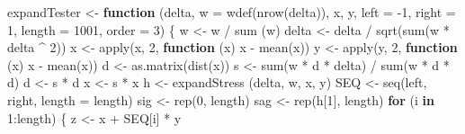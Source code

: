 \documentclass[
  12pt,
  letterpaper,
  DIV=11,
  numbers=noendperiod]{scrreprt}
\newenvironment{Shaded}{\begin{snugshade}}{\end{snugshade}}
\newcommand{\AttributeTok}[1]{\textcolor[rgb]{0.40,0.45,0.13}{#1}}
\newcommand{\ControlFlowTok}[1]{\textcolor[rgb]{0.00,0.23,0.31}{\textbf{#1}}}
\newcommand{\DecValTok}[1]{\textcolor[rgb]{0.68,0.00,0.00}{#1}}
\newcommand{\FunctionTok}[1]{\textcolor[rgb]{0.28,0.35,0.67}{#1}}
\newcommand{\NormalTok}[1]{\textcolor[rgb]{0.00,0.23,0.31}{#1}}
\newcommand{\OtherTok}[1]{\textcolor[rgb]{0.00,0.23,0.31}{#1}}
\newcommand{\SpecialCharTok}[1]{\textcolor[rgb]{0.37,0.37,0.37}{#1}}
\theoremstyle{remark}
\begin{document}
\begin{Shaded}
\begin{Highlighting}[]
\NormalTok{expandTester }\OtherTok{\textless{}{-}} \ControlFlowTok{function}\NormalTok{ (delta,}
                    \AttributeTok{w =} \FunctionTok{wdef}\NormalTok{(}\FunctionTok{nrow}\NormalTok{(delta)),}
\NormalTok{                    x,}
\NormalTok{                    y,}
                    \AttributeTok{left =} \SpecialCharTok{{-}}\DecValTok{1}\NormalTok{,}
                    \AttributeTok{right =} \DecValTok{1}\NormalTok{,}
                    \AttributeTok{length =} \DecValTok{1001}\NormalTok{,}
                    \AttributeTok{order =} \DecValTok{3}\NormalTok{) \{}
\NormalTok{  w }\OtherTok{\textless{}{-}}\NormalTok{ w }\SpecialCharTok{/} \FunctionTok{sum}\NormalTok{ (w)}
\NormalTok{  delta }\OtherTok{\textless{}{-}}\NormalTok{ delta }\SpecialCharTok{/} \FunctionTok{sqrt}\NormalTok{(}\FunctionTok{sum}\NormalTok{(w }\SpecialCharTok{*}\NormalTok{ delta }\SpecialCharTok{\^{}} \DecValTok{2}\NormalTok{))}
\NormalTok{  x }\OtherTok{\textless{}{-}} \FunctionTok{apply}\NormalTok{(x, }\DecValTok{2}\NormalTok{, }\ControlFlowTok{function}\NormalTok{ (x)}
\NormalTok{    x }\SpecialCharTok{{-}} \FunctionTok{mean}\NormalTok{(x))}
\NormalTok{  y }\OtherTok{\textless{}{-}} \FunctionTok{apply}\NormalTok{(y, }\DecValTok{2}\NormalTok{, }\ControlFlowTok{function}\NormalTok{ (x)}
\NormalTok{    x }\SpecialCharTok{{-}} \FunctionTok{mean}\NormalTok{(x))}
\NormalTok{  d }\OtherTok{\textless{}{-}} \FunctionTok{as.matrix}\NormalTok{(}\FunctionTok{dist}\NormalTok{(x))}
\NormalTok{  s }\OtherTok{\textless{}{-}} \FunctionTok{sum}\NormalTok{(w }\SpecialCharTok{*}\NormalTok{ d }\SpecialCharTok{*}\NormalTok{ delta) }\SpecialCharTok{/} \FunctionTok{sum}\NormalTok{(w }\SpecialCharTok{*}\NormalTok{ d }\SpecialCharTok{*}\NormalTok{ d)}
\NormalTok{  d }\OtherTok{\textless{}{-}}\NormalTok{ s }\SpecialCharTok{*}\NormalTok{ d}
\NormalTok{  x }\OtherTok{\textless{}{-}}\NormalTok{ s }\SpecialCharTok{*}\NormalTok{ x}
\NormalTok{  h }\OtherTok{\textless{}{-}} \FunctionTok{expandStress}\NormalTok{ (delta, w, x, y)}
\NormalTok{  SEQ }\OtherTok{\textless{}{-}} \FunctionTok{seq}\NormalTok{(left, right, }\AttributeTok{length =}\NormalTok{ length)}
\NormalTok{  sig }\OtherTok{\textless{}{-}} \FunctionTok{rep}\NormalTok{(}\DecValTok{0}\NormalTok{, length)}
\NormalTok{  sag }\OtherTok{\textless{}{-}} \FunctionTok{rep}\NormalTok{(h[}\DecValTok{1}\NormalTok{], length)}
  \ControlFlowTok{for}\NormalTok{ (i }\ControlFlowTok{in} \DecValTok{1}\SpecialCharTok{:}\NormalTok{length) \{}
\NormalTok{    z }\OtherTok{\textless{}{-}}\NormalTok{ x }\SpecialCharTok{+}\NormalTok{ SEQ[i] }\SpecialCharTok{*}\NormalTok{ y}

\end{Highlighting}
\end{Shaded}
\end{document}
